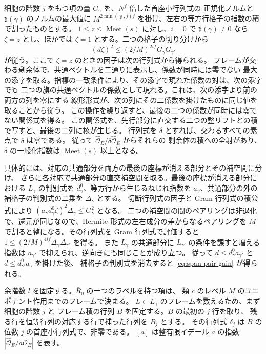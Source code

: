 細胞の階数 \(j\) をもつ項の量 \(G_\gamma\) を、\(N^f\) 倍した首座小行列式の
正規化ノルムと \(\mathfrak d(\gamma)\) のノルムの最大値に
\(M^{2\min(\varrho,j)f}\) を掛け、左右の等方行格子の指数の積で割ったものとする。
\(1\le z\le\operatorname{Meet}(s)\) に対し、\(i=0\) で \(\mathfrak d(\gamma)\ne0\) なら
\(\zeta=z\) とし、ほかでは \(\zeta=1\) とする。二つの格子の切り分けから
\begin{equation}\label{eq:span-pair-gain}
 (d\zeta)^2\le (2/M)^{2if}G_\gamma G_{\gamma'}
\end{equation}
が従う。ここで \(\zeta=z\) のときの因子は次の行列式から得られる。
フレームが交わる剰余体で、共通ベクトルを二通りに表示し、係数が同時には零でない
最大の添字を取る。指標の一致条件により、その添字で現れた係数の対は、次の添字でも
二つの旗の共通ベクトルの係数として現れる。これは、次の添字より前の両方の列を零にする
線形形式が、次の列にその二係数を掛けたものに同じ値を取ることから従う。
この操作を繰り返すと、最後の二つの係数が同時には零でない関係式を得る。
この関係式を、先行部分に直交する二つの整リフトとの積で写すと、最後の二列に核が生じる。
行列式を \(\delta\) とすれば、交わるすべての素点で \(\delta\) は零である。
従って \(\widehat{\mathcal O}_E/\delta\widehat{\mathcal O}_E\) からそれらの
剰余体の積への全射があり、\(\delta\) の一般化指数は \(\operatorname{Meet}(s)\) 以上となる。

具体的には、対応の共通部分を両方の最後の座標が消える部分とその補空間に分け、
さらに各対応で共通部分の直交補空間を取る。最後の座標が消える部分における
\(L_\gamma\) の判別式を \(d_\gamma^0\)、等方行から生じるねじれ指数を
\(a_\gamma\)、共通部分の外の補格子の判別式の二乗を \(\Delta_\gamma\) とする。
切断行列式の因子と Gram 行列式の積公式により
\((a_\gamma d_\gamma^0\zeta)^2\Delta_\gamma\le G_\gamma^2\) となる。
二つの補空間の間のペアリングは非退化で、還元が同じなので、Hermite 形式の左右成分の差からなるペアリングを
\(M\) で割ると整になる。その行列式を Gram 行列式で評価すると
\(1\le(2/M)^{4if}\Delta_\gamma\Delta_{\gamma'}\) を得る。
また \(L_\gamma\) の共通部分に \(L_{\gamma'}\) の条件を課すと増える指数は
\(a_{\gamma'}\) で抑えられ、逆向きにも同じことが成り立つ。
従って \(d\le d_\gamma^0a_{\gamma'}\) と \(d\le d_{\gamma'}^0a_\gamma\) を掛けた後、
補格子の判別式を消去すると \eqref{eq:span-pair-gain} が得られる。

余階数 \(l\) を固定する。\(\bar R_0\) の一つのラベルを持つ項は、
類 \(c\) のレベル \(M\) のユニポテント作用までのフレームで決まる。
\(L\subset L_\gamma\) のフレームを数えるため、まず細胞の階数 \(j\) と
フレーム積の行列 \(B\) を固定する。\(B\) の最初の \(j\) 行を取り、
残る行を恒等行列の対応する行で補った行列を \(B_j\) とする。
その行列式 \(\delta_j\) は \(B\) の位数 \(j\) の首座小行列式で、非零である。
\([a]\) は整有限イデール \(a\) の指数
\(|\widehat{\mathcal O}_E/a\widehat{\mathcal O}_E|\) を表す。


